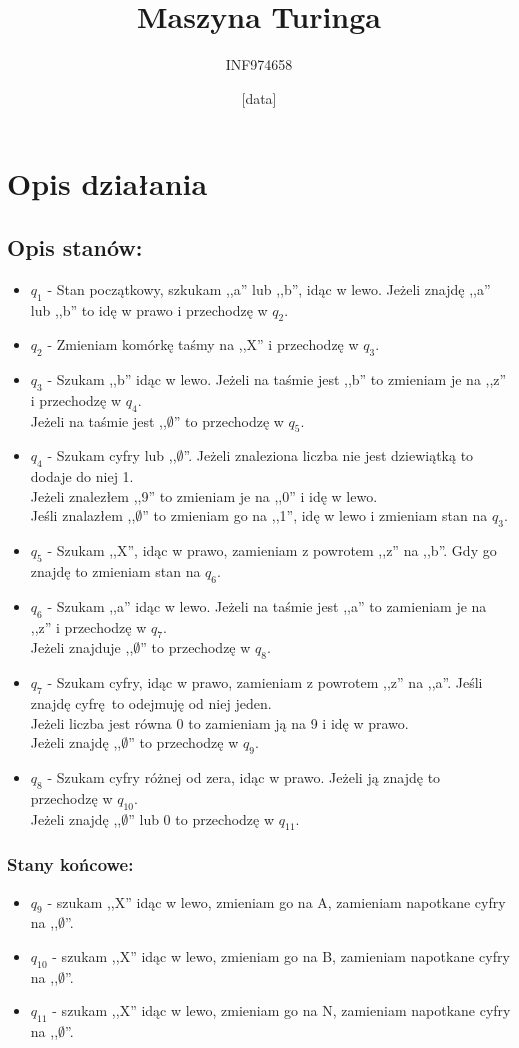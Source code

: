 \documentclass[a4paper,12pt]{article}
\title{Maszyna Turinga}
\author{INF974658}
\date{[data]}
\begin{document}
\section{Opis działania}

\subsection*{Opis stanów:}

\begin{itemize}
	\item $q_1$ - Stan początkowy, szkukam ,,a'' lub ,,b'', idąc w lewo. Jeżeli znajdę ,,a'' lub ,,b'' to idę w prawo i przechodzę w $q_2$.
	\item $q_2$ - Zmieniam komórkę taśmy na ,,X'' i przechodzę w $q_3$.
	\item $q_3$ - Szukam ,,b'' idąc w lewo. Jeżeli na taśmie jest ,,b'' to zmieniam je na ,,z'' i przechodzę w $q_4$.\\
		Jeżeli na taśmie jest ,,$\emptyset$'' to przechodzę w $q_5$.
	\item $q_4$ - Szukam cyfry lub ,,$\emptyset$''. Jeżeli znaleziona liczba nie jest dziewiątką to dodaje do niej 1.\\
		Jeżeli znalezłem ,,9'' to zmieniam je na ,,0'' i idę w lewo.\\
		Jeśli znalazłem ,,$\emptyset$'' to zmieniam go na ,,1'', idę w lewo i zmieniam stan na $q_3$. 
	\item $q_5$ - Szukam ,,X'', idąc w prawo, zamieniam z powrotem ,,z'' na ,,b''. Gdy go znajdę to zmieniam stan na $q_6$.
	\item $q_6$ - Szukam ,,a'' idąc w lewo.
			Jeżeli na taśmie jest ,,a'' to zamieniam je na ,,z'' i  przechodzę w $q_7$.\\
			Jeżeli znajduje ,,$\emptyset$'' to przechodzę w $q_8$.
	\item $q_7$ - Szukam cyfry, idąc w prawo, zamieniam z powrotem ,,z'' na ,,a''. Jeśli znajdę cyfrę to odejmuję od niej jeden. \\
			Jeżeli liczba jest równa 0 to zamieniam ją na 9 i idę w prawo.\\
			Jeżeli znajdę ,,$\emptyset$'' to przechodzę w $q_9$.
	\item $q_8$ - Szukam cyfry różnej od zera, idąc w prawo. Jeżeli ją znajdę to przechodzę w $q_{10}$.\\
			Jeżeli znajdę ,,$\emptyset$'' lub 0 to przechodzę w $q_{11}$.
\end{itemize}
\subsubsection*{Stany końcowe:}
\begin{itemize}
		\item $q_9$ - szukam ,,X'' idąc w lewo, zmieniam go na A, zamieniam napotkane cyfry na ,,$\emptyset$''.
	\item $q_{10}$ - szukam ,,X'' idąc w lewo, zmieniam go na B, zamieniam napotkane cyfry na ,,$\emptyset$''.
	\item $q_{11}$ - szukam ,,X'' idąc w lewo, zmieniam go na N, zamieniam napotkane cyfry na ,,$\emptyset$''.
\end{itemize}
\end{document}
